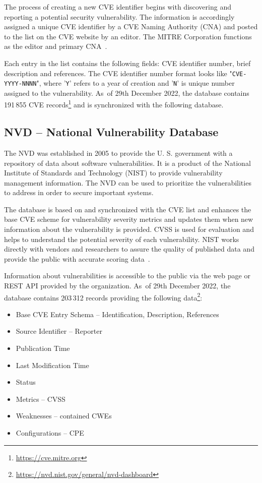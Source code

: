     The process of creating a new CVE identifier begins with discovering and reporting a potential security
    vulnerability. The information is accordingly assigned a unique CVE identifier by a CVE Naming Authority
    (CNA) and posted to the list on the CVE website by an editor. The MITRE Corporation functions as the editor
    and primary CNA~\cite{CVE}.

    Each entry in the list contains the following fields: CVE identifier number, brief description and references.
    The CVE identifier number format looks like "\texttt{CVE-YYYY-NNNN}", where
    '\texttt{Y}' refers to a year of creation and '\texttt{N}' is unique number assigned to the vulnerability.
    As~of 29th December 2022, the database contains 191\,855 CVE records\footnote{\href{https://cve.mitre.org}
    {https://cve.mitre.org}} and is synchronized with the following database.

  \subsection*{NVD -- National Vulnerability Database}
  The NVD was established in 2005 to provide the U. S. government with a repository of data about software
  vulnerabilities. It is a product of the National Institute of Standards and Technology (NIST) to provide
  vulnerability management information. The NVD can be used to prioritize the vulnerabilities to address
  in order to secure important systems.

  The database is based on and synchronized with the CVE list and enhances the base CVE scheme for vulnerability
  severity metrics and updates them when new information about the vulnerability is provided. CVSS is used
  for evaluation and helps to understand the potential severity of each vulnerability. NIST works directly
  with vendors and researchers to assure the quality of published data and provide the public with accurate
  scoring data~\cite{NVD}.

  Information about vulnerabilities is accessible to the public via the web page or REST API provided
  by the organization. As~of 29th December 2022, the database contains 203\,312 records providing the following
  data\footnote{\href{https://nvd.nist.gov/general/nvd-dashboard}{https://nvd.nist.gov/general/nvd-dashboard}}:
  \begin{itemize}
      \item Base CVE Entry Schema -- Identification, Description, References
      \item Source Identifier -- Reporter
      \item Publication Time
      \item Last Modification Time
      \item Status
      \item Metrics -- CVSS
      \item Weaknesses -- contained CWEs
      \item Configurations -- CPE
  \end{itemize}

